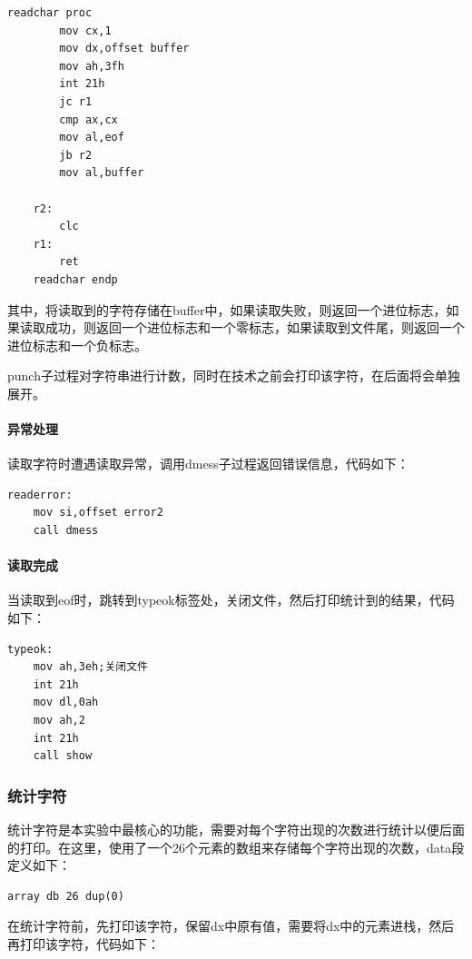 \documentclass[UTF8,12pt]{article}
\begin{document}
\begin{lstlisting}[title=readchar子过程,frame=shadowbox]
    readchar proc
        mov cx,1
        mov dx,offset buffer
        mov ah,3fh
        int 21h
        jc r1
        cmp ax,cx
        mov al,eof
        jb r2
        mov al,buffer

    r2:
        clc
    r1:
        ret
    readchar endp
\end{lstlisting}

其中，将读取到的字符存储在buffer中，如果读取失败，则返回一个进位标志，如果读取成功，则返回一个进位标志和一个零标志，如果读取到文件尾，则返回一个进位标志和一个负标志。

punch子过程对字符串进行计数，同时在技术之前会打印该字符，在后面将会单独展开。

\paragraph{异常处理}
读取字符时遭遇读取异常，调用dmess子过程返回错误信息，代码如下：

\begin{lstlisting}[title=异常处理,frame=shadowbox]
    readerror:
    mov si,offset error2
    call dmess
\end{lstlisting}

\paragraph{读取完成}
当读取到eof时，跳转到typeok标签处，关闭文件，然后打印统计到的结果，代码如下：

\begin{lstlisting}[title=读取完成,frame=shadowbox]
    typeok:
    mov ah,3eh;关闭文件
    int 21h
    mov dl,0ah
    mov ah,2
    int 21h
    call show
\end{lstlisting}

\subsubsection{统计字符}
统计字符是本实验中最核心的功能，需要对每个字符出现的次数进行统计以便后面的打印。在这里，使用了一个26个元素的数组来存储每个字符出现的次数，data段定义如下：

\begin{lstlisting}[title=定义数组,frame=shadowbox]
    array db 26 dup(0)
\end{lstlisting}

在统计字符前，先打印该字符，保留dx中原有值，需要将dx中的元素进栈，然后再打印该字符，代码如下：
\end{document}
